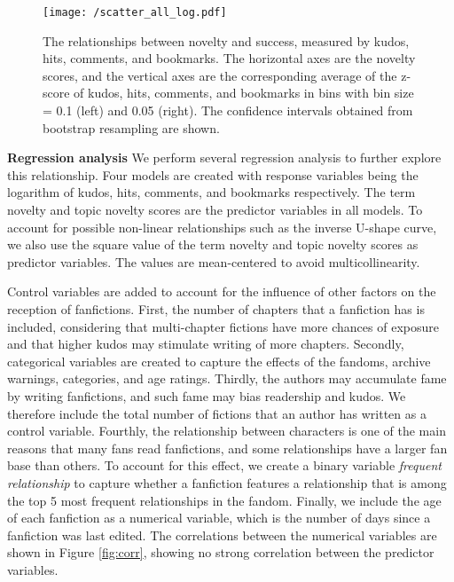 \documentclass[letterpaper]{article} %
\begin{document}
\begin{figure*}
    \centering
          \texttt{[image: /scatter\_all\_log.pdf]}
        \caption{The relationships between novelty and success, measured by kudos, hits, comments, and bookmarks. The horizontal axes are the novelty scores, and the vertical axes are the corresponding average of the z-score of kudos, hits, comments, and bookmarks in bins with bin size = 0.1 (left) and 0.05 (right). The confidence intervals obtained from bootstrap resampling are shown. }
        \label{fig:tfidf_lda_kudos}
\end{figure*}


\textbf{Regression analysis}   We perform several regression analysis to further explore this relationship. Four models are created with response variables being the logarithm of kudos, hits, comments, and bookmarks respectively. The term novelty and topic novelty scores are the predictor variables in all models. To account for possible non-linear relationships such as the inverse U-shape curve, we also use the square value of the term novelty and topic novelty scores as predictor variables. The values are mean-centered to avoid multicollinearity.

Control variables are added to account for the influence of other factors on the reception of fanfictions. First, the number of chapters that a fanfiction has is included, considering that multi-chapter fictions have more chances of exposure and that higher kudos may stimulate writing of more chapters. Secondly, categorical variables are created to capture the effects of the fandoms, archive warnings, categories, and age ratings. Thirdly, the authors may accumulate fame by writing fanfictions, and such fame may bias readership and kudos. We therefore include the total number of fictions that an author has written as a control variable. Fourthly, the relationship between characters is one of the main reasons that many fans read fanfictions, and some relationships have a larger fan base than others. To account for this effect, we create a binary variable \emph{frequent relationship} to capture whether a fanfiction features a relationship that is among the top 5 most frequent relationships in the fandom. Finally, we include the age of each fanfiction as a numerical variable, which is the number of days since a fanfiction was last edited. The correlations between the numerical variables are shown in Figure \ref{fig:corr}, showing no strong correlation between the predictor variables.
\end{document}
